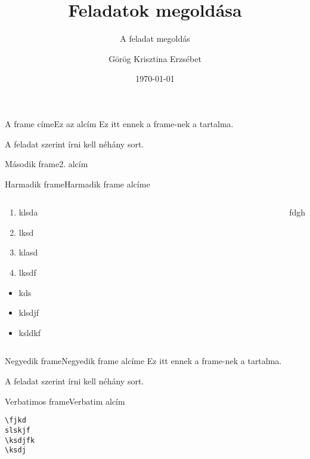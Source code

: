 \documentclass[aspectratio=169, bigger, xcolor={table}]{beamer}
\author{Görög Krisztina Erzsébet}
\title{Feladatok megoldása}
\subtitle{A feladat megoldás}
\institute{Miskolci Egyetem}
\date{\today}
\begin{document}
\maketitle

\begin{frame}{A frame címe}{Ez az alcím}
Ez itt ennek a frame-nek a tartalma.

A feladat szerint írni kell néhány sort.
\end{frame}

\begin{frame}[allowframebreaks]{Második frame}{2. alcím}
\hulipsum
\end{frame}

\begin{frame}{Harmadik frame}{Harmadik frame alcíme}
\begin{columns}[c]

\begin{column}{0.5\linewidth}
\begin{enumerate}
\item klsda
\item lksd
\item klasd
\item lksdf
\end{enumerate}

\begin{itemize}
\item kds
\item klsdjf
\item ksldkf
\end{itemize}
\end{column}

\begin{column}{0.5\linewidth}

\end{column}
fdgh
\end{columns}
\end{frame}

\begin{frame}{Negyedik frame}{Negyedik frame alcíme}
Ez itt ennek a frame-nek a tartalma.

A feladat szerint írni kell néhány sort.
\end{frame}

\begin{frame}[fragile]{Verbatimos frame}{Verbatim alcím}

\begin{verbatim}
\fjkd
slskjf
\ksdjfk
\ksdj

\end{verbatim}

\end{frame}
\end{document}
